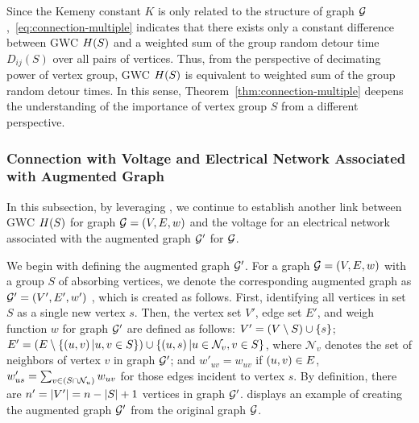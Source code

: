 \documentclass[10pt,twocolumn,twoside]{IEEEtran}
\begin{document}
Since the Kemeny constant \(K\) is only related to the structure of graph \(\mathcal{G}\),~\eqref{eq:connection-multiple} indicates that there exists only a constant difference between GWC \(H(S)\) and  a weighted sum of the group random detour time \(D_{ij}(S)\) over all pairs of vertices. Thus, from the perspective of decimating power of vertex group,
GWC \(H(S)\) is equivalent to weighted sum of the group random detour times. In this sense, Theorem~\ref{thm:connection-multiple} deepens the understanding of the importance of vertex group \(S\) from a different perspective.

\iffalse
    \subsubsection{Connection with Voltage and Electrical Network Associated with Augmented Graph}

    In this subsection, by leveraging , we continue to establish another link between GWC \(H(S)\) for graph  \(\mathcal{G}=\left( V,E,w \right)\) and the voltage for an electrical network associated with the augmented graph \(\mathcal{G}'\) for \(\mathcal{G}\).

    We begin with defining the augmented graph  \(\mathcal{G}'\).  For a graph \(\mathcal{G}=\left( V,E,w \right)\) with a group \(S\) of absorbing vertices, we denote the corresponding augmented graph as \(\mathcal{G}'=\left( V',E',w' \right)\) , which is created as follows. First, identifying all vertices in set  \(S\) as a single new vertex \(s\). Then, the vertex set $V'$, edge set $E'$, and weigh function $w$ for graph  \(\mathcal{G}'\) are defined as follows: \(V'=\left( V\setminus S \right)\cup\left\{s \right\}\);  \(E'=\left( E\setminus\left\{\left( u,v \right)|u,v\in S \right\} \right)\cup\left\{\left( u,s \right)|u\in\mathcal{N}_v,v\in S \right\}\), where \(\mathcal{N}_v\) denotes the set of neighbors of vertex \(v\) in graph  \(\mathcal{G}'\); and \(w'_{uv}=w_{uv}\) if \(\left( u,v \right)\in E\), \(w'_{us}=\sum_{v\in\left( S\cap\mathcal{N}_u \right)}w_{uv}\) for those edges incident to vertex $s$. By definition, there are \( n'=\left|V' \right|=n-\left|S \right|+1\) vertices in graph  \(\mathcal{G}'\).  displays an example of creating the augmented graph \(\mathcal{G}'\) from the original graph \(\mathcal{G}\).
\end{document}
